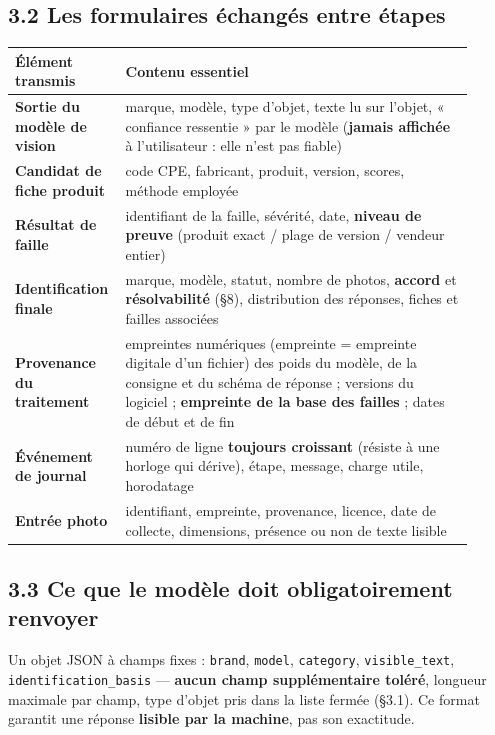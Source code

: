 \documentclass[11pt,a4paper]{article}
\begin{document}
\subsection*{3.2 Les formulaires échangés entre étapes}
\sloppy
\begin{longtable}{|p{0.180\linewidth}|p{0.731\linewidth}|}
\hline
\textbf{Élément transmis} & \textbf{Contenu essentiel} \\ \hline
\endhead
\textbf{Sortie du modèle de vision} & marque, modèle, type d'objet, texte lu sur l'objet, « confiance ressentie » par le modèle (\textbf{jamais affichée} à l'utilisateur : elle n'est pas fiable) \\ \hline
\textbf{Candidat de fiche produit} & code CPE, fabricant, produit, version, scores, méthode employée \\ \hline
\textbf{Résultat de faille} & identifiant de la faille, sévérité, date, \textbf{niveau de preuve} (produit exact / plage de version / vendeur entier) \\ \hline
\textbf{Identification finale} & marque, modèle, statut, nombre de photos, \textbf{accord} et \textbf{résolvabilité} (§8), distribution des réponses, fiches et failles associées \\ \hline
\textbf{Provenance du traitement} & empreintes numériques (empreinte = empreinte digitale d'un fichier) des poids du modèle, de la consigne et du schéma de réponse ; versions du logiciel ; \textbf{empreinte de la base des failles} ; dates de début et de fin \\ \hline
\textbf{Événement de journal} & numéro de ligne \textbf{toujours croissant} (résiste à une horloge qui dérive), étape, message, charge utile, horodatage \\ \hline
\textbf{Entrée photo} & identifiant, empreinte, provenance, licence, date de collecte, dimensions, présence ou non de texte lisible \\ \hline
\end{longtable}
\subsection*{3.3 Ce que le modèle doit obligatoirement renvoyer}
Un objet JSON à champs fixes : \texttt{brand}, \texttt{model}, \texttt{category}, \texttt{visible\_\allowbreak{}text}, \texttt{identification\_\allowbreak{}basis} — \textbf{aucun champ supplémentaire toléré}, longueur maximale par champ, type d'objet pris dans la liste fermée (§3.1). Ce format garantit une réponse \textbf{lisible par la machine}, pas son exactitude.
\end{document}
